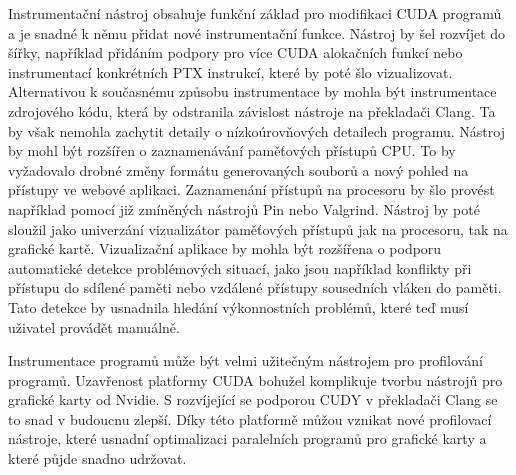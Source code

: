 Instrumentační nástroj obsahuje funkční základ pro modifikaci CUDA programů a je snadné k němu přidat nové instrumentační funkce.
Nástroj by šel rozvíjet do šířky, například přidáním podpory pro více CUDA alokačních funkcí nebo instrumentací konkrétních PTX instrukcí, které by poté šlo vizualizovat. Alternativou k současnému způsobu instrumentace by mohla být instrumentace zdrojového kódu, která by odstranila závislost nástroje na překladači Clang. Ta by však nemohla zachytit detaily o nízkoúrovňových detailech programu.
Nástroj by mohl být rozšířen o zaznamenávání paměťových přístupů CPU. To by vyžadovalo drobné změny formátu generovaných souborů a nový pohled na přístupy ve webové aplikaci. Zaznamenání přístupů na procesoru by šlo provést například pomocí již zmíněných nástrojů Pin\cite{pin} nebo Valgrind\cite{valgrind}. Nástroj by poté sloužil jako univerzání vizualizátor paměťových přístupů jak na procesoru, tak na grafické kartě. Vizualizační aplikace by mohla být rozšířena o podporu automatické detekce problémových situací, jako jsou například konflikty při přístupu do sdílené paměti nebo vzdálené přístupy sousedních vláken do paměti. Tato detekce by usnadnila hledání výkonnostních problémů, které teď musí uživatel provádět manuálně.

Instrumentace programů může být velmi užitečným nástrojem pro profilování programů. Uzavřenost platformy CUDA bohužel komplikuje tvorbu nástrojů pro grafické karty od Nvidie. S rozvíjející se podporou CUDY v překladači Clang se to snad v budoucnu zlepší. Díky této platformě můžou vznikat nové profilovací nástroje, které usnadní optimalizaci paralelních programů pro grafické karty a které půjde snadno udržovat.
